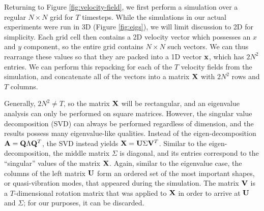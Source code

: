 \documentclass[11pt]{article}
\begin{document}

Returning to Figure \ref{fig:velocity-field}, we first perform a simulation over a regular $N \times N$ grid for $T$ timesteps. While the simulations in our actual experiments were run in 3D (Figure \ref{fig:eigs}), we will limit discussion to 2D for simplicity. Each grid cell then contains a 2D velocity vector which possesses an $x$ and $y$ component, so the entire grid contains $N \times N$ such vectors. We can thus rearrange these values so that they are packed into a 1D vector $\mathbf{x}$, which has $2N^2$ entries. We can perform this repacking for each of the $T$ velocity fields from the simulation, and concatenate all of the vectors into a matrix $\mathbf{X}$ with $2N^2$ rows and $T$ columns.

Generally, $2N^2 \neq T$, so the matrix $\mathbf{X}$ will be rectangular, and an eigenvalue analysis can only be performed on square matrices. However, the singular value decomposition (SVD) can always be performed regardless of dimension, and the results possess many eigenvalue-like qualities. Instead of the eigen-decomposition $\mathbf{A} = \mathbf{Q} \Lambda \mathbf{Q}^T$, the SVD instead yields $\mathbf{X} = \mathbf{U} \Sigma \mathbf{V}^T$. Similar to the eigen-decomposition, the middle matrix $\Sigma$ is diagonal, and its entries correspond to the ``singular'' values of the matrix $\mathbf{X}$. Again, similar to the eigenvalue case, the columns of the left matrix $\mathbf{U}$ form an ordered set of the most important shapes, or quasi-vibration modes, that appeared during the simulation. The matrix $\mathbf{V}$ is a $T$-dimensional rotation matrix that was applied to $\mathbf{X}$ in order to arrive at $\mathbf{U}$ and $\Sigma$; for our purposes, it can be discarded.
\end{document}
